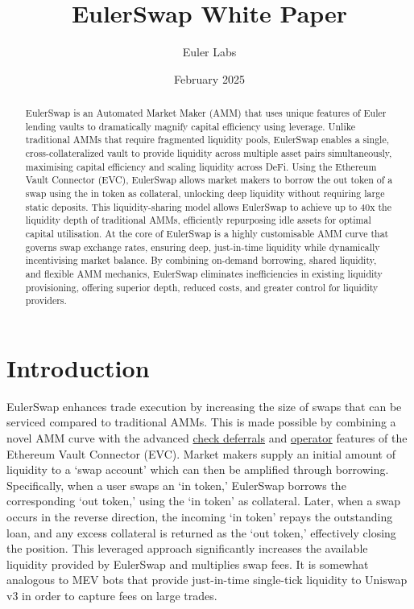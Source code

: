 \documentclass{article}
\title{EulerSwap White Paper}
\author{Euler Labs}
\date{February 2025}
\begin{document}
\maketitle

\begin{abstract}    
    EulerSwap is an Automated Market Maker (AMM) that uses unique features of Euler lending vaults to dramatically magnify capital efficiency using leverage. Unlike traditional AMMs that require fragmented liquidity pools, EulerSwap enables a single, cross-collateralized vault to provide liquidity across multiple asset pairs simultaneously, maximising capital efficiency and scaling liquidity across DeFi. Using the Ethereum Vault Connector (EVC), EulerSwap allows market makers to borrow the out token of a swap using the in token as collateral, unlocking deep liquidity without requiring large static deposits. This liquidity-sharing model allows EulerSwap to achieve up to 40x the liquidity depth of traditional AMMs, efficiently repurposing idle assets for optimal capital utilisation. At the core of EulerSwap is a highly customisable AMM curve that governs swap exchange rates, ensuring deep, just-in-time liquidity while dynamically incentivising market balance. By combining on-demand borrowing, shared liquidity, and flexible AMM mechanics, EulerSwap eliminates inefficiencies in existing liquidity provisioning, offering superior depth, reduced costs, and greater control for liquidity providers.
\end{abstract}

\section{Introduction}

EulerSwap enhances trade execution by increasing the size of swaps that can be serviced compared to traditional AMMs. This is made possible by combining a novel AMM curve with the advanced \href{https://docs.euler.finance/developers/evc/keyConcepts?_highlight=operator#batch-operations}{check deferrals} and \href{https://docs.euler.finance/developers/evc/keyConcepts?_highlight=operator#operators}{operator} features of the Ethereum Vault Connector (EVC). Market makers supply an initial amount of liquidity to a `swap account' which can then be amplified through borrowing. Specifically, when a user swaps an `in token,' EulerSwap borrows the corresponding `out token,' using the `in token' as collateral. Later, when a swap occurs in the reverse direction, the incoming `in token' repays the outstanding loan, and any excess collateral is returned as the `out token,' effectively closing the position. This leveraged approach significantly increases the available liquidity provided by EulerSwap and multiplies swap fees. It is somewhat analogous to MEV bots that provide just-in-time single-tick liquidity to Uniswap v3 in order to capture fees on large trades.
\end{document}
